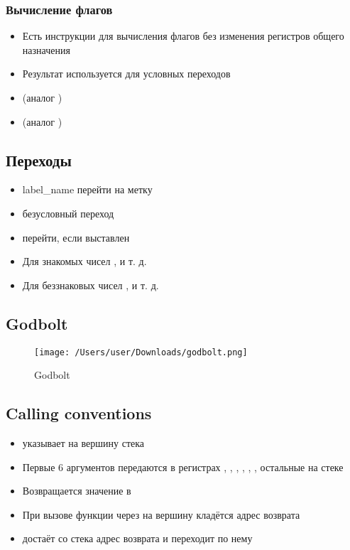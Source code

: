   \subsubsection{Вычисление флагов}
    \begin{itemize}
      \item Есть инструкции для вычисления флагов без изменения регистров общего назначения
      \item Результат используется для условных переходов
      \item {} (аналог )
      \item {} (аналог )
    \end{itemize}
  
  \subsection{Переходы}
    \begin{itemize}
      \item {} label\_name перейти на метку
      \item {} безусловный переход
      \item {} перейти, если выставлен 
      \item Для знакомых чисел ,  и т. д.
      \item Для беззнаковых чисел ,  и т. д.
    \end{itemize}
  
  \subsection{Godbolt}
\begin{figure}[H]
  \centering
  \texttt{[image: /Users/user/Downloads/godbolt.png]}
  \caption{Godbolt}
  \label{fig:godbolt}
\end{figure}

  \subsection{Calling conventions}
    \begin{itemize}
      \item {} указывает на вершину стека
      \item Первые 6 аргументов передаются в регистрах , , , , , , остальные на стеке
      \item Возвращается значение в 
      \item При вызове функции через  на вершину кладётся адрес возврата
      \item {} достаёт со стека адрес возврата и переходит по нему
    \end{itemize}
    
